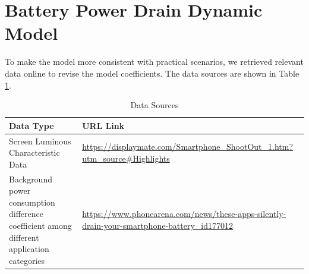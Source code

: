 \documentclass{mcmthesis}  %
\begin{document}
	\vspace*{-15pt}
	\section{Battery Power Drain Dynamic Model} 
	
	To make the model more consistent with practical scenarios, we retrieved relevant data online to revise the model coefficients. The data sources are shown in Table \ref{数据来源}.
	
	\begin{table}[h!]
		\centering
		\caption{Data Sources}
		\label{数据来源}
		\renewcommand{\arraystretch}{1}
		\renewcommand{\heavyrulewidth}{1.2pt}
		\begin{tabular}{p{6.5cm}p{8cm}}
			\toprule
			\textbf{Data Type} & \textbf{URL Link} \\
			\midrule
			\rowcolor{LightBlue}
			Screen Luminous Characteristic Data & {\small\url{https://displaymate.com/Smartphone_ShootOut_1.htm?utm_source#Highlights}} \\
			Background power consumption difference coefficient among different application categories & {\footnotesize\url{https://www.phonearena.com/news/these-apps-silently-drain-your-smartphone-battery_id177012}} \\
			\bottomrule
		\end{tabular}
		\renewcommand{\heavyrulewidth}{0.8pt}
	\end{table}
	
	\vspace*{-5pt}
\end{document}
